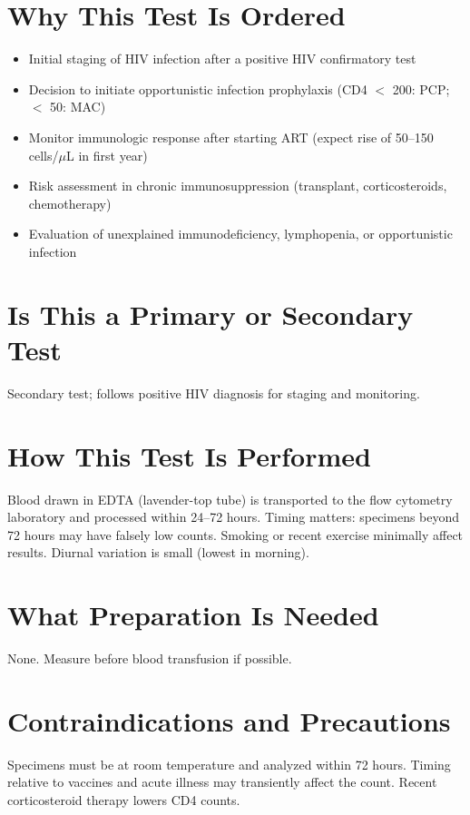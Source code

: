 \section*{Why This Test Is Ordered}
\begin{itemize}
  \item Initial staging of HIV infection after a positive HIV confirmatory test
  \item Decision to initiate opportunistic infection prophylaxis (CD4 $<$ 200: PCP; $<$ 50: MAC)
  \item Monitor immunologic response after starting ART (expect rise of 50--150 cells/$\mu$L in first year)
  \item Risk assessment in chronic immunosuppression (transplant, corticosteroids, chemotherapy)
  \item Evaluation of unexplained immunodeficiency, lymphopenia, or opportunistic infection
\end{itemize}

\section*{Is This a Primary or Secondary Test}
Secondary test; follows positive HIV diagnosis for staging and monitoring.

\section*{How This Test Is Performed}
Blood drawn in EDTA (lavender-top tube) is transported to the flow cytometry laboratory and processed within 24--72 hours. Timing matters: specimens beyond 72 hours may have falsely low counts. Smoking or recent exercise minimally affect results. Diurnal variation is small (lowest in morning).

\section*{What Preparation Is Needed}
None. Measure before blood transfusion if possible.

\section*{Contraindications and Precautions}
Specimens must be at room temperature and analyzed within 72 hours. Timing relative to vaccines and acute illness may transiently affect the count. Recent corticosteroid therapy lowers CD4 counts.

